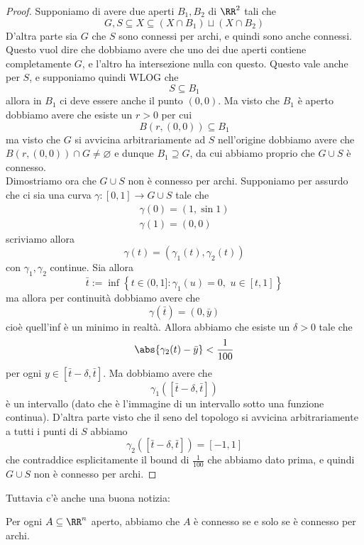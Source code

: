 \documentclass[11pt]{scrartcl}
\newcommand{\eset}{\varnothing}
\begin{document}
	\begin{proof}
		Supponiamo di avere due aperti $B_1,B_2$ di $\RR^2$ tali che
		$$G,S\subseteq X\subseteq\left(X\cap B_1\right)\sqcup \left(X\cap B_2\right)$$
		D'altra parte sia $G$ che $S$ sono connessi per archi, e quindi sono anche connessi. Questo vuol dire che dobbiamo avere che uno dei due aperti contiene completamente $G$, e l'altro ha intersezione nulla con questo. Questo vale anche per $S$, e supponiamo quindi WLOG che 
		$$S\subseteq B_1$$
		allora in $B_1$ ci deve essere anche il punto $(0,0)$. Ma visto che $B_1$ è aperto dobbiamo avere che esiste un $r>0$ per cui
		$$B(r,(0,0))\subseteq B_1$$
		ma visto che $G$ si avvicina arbitrariamente ad $S$ nell'origine dobbiamo avere che $B(r,(0,0))\cap G\ne \eset$ e dunque $B_1\supseteq G$, da cui abbiamo proprio che $G\cup S$ è connesso. \\
		Dimostriamo ora che $G\cup S$ non è connesso per archi. Supponiamo per assurdo che ci sia una curva $\gamma:[0,1]\to G\cup S$ tale che
		\begin{gather*}
			\gamma(0)=(1,\sin 1) \\
			\gamma(1)=(0,0)
		\end{gather*}
		scriviamo allora
		$$\gamma(t)=\left(\gamma_1(t),\gamma_2(t)\right)$$
		con $\gamma_1,\gamma_2$ continue. Sia allora
		$$\bar{t}:=\inf\left\{t\in (0,1]:\gamma_1(u)=0,\,\, u\in [t,1]  \right\}$$
		ma allora per continuità dobbiamo avere che 
		$$\gamma(\bar{t})=(0,\bar{y})$$
		cioè quell'inf è un minimo in realtà. Allora abbiamo che esiste un $\delta>0$ tale che
		$$\abs{\gamma_2(t)-\bar{y}}<\frac{1}{100}$$
		per ogni $y\in [\bar{t}-\delta,\bar{t}]$. Ma dobbiamo avere che
		$$\gamma_1\left(\left[\bar{t}-\delta,\bar{t}\right]\right)$$
		è un intervallo (dato che è l'immagine di un intervallo sotto una funzione continua). D'altra parte visto che il seno del topologo si avvicina arbitrariamente a tutti i punti di $S$ abbiamo
		$$\gamma_2\left(\left[\bar{t}-\delta,\bar{t}\right]\right)=[-1,1]$$
		che contraddice esplicitamente il bound di $\frac{1}{100}$ che abbiamo dato prima, e quindi $G\cup S$ non è connesso per archi.
	\end{proof}
	Tuttavia c'è anche una buona notizia:
	\begin{theorem}
		Per ogni $A\subseteq \RR^n$ aperto, abbiamo che $A$ è connesso se e solo se è connesso per archi.
	\end{theorem}
\end{document}
